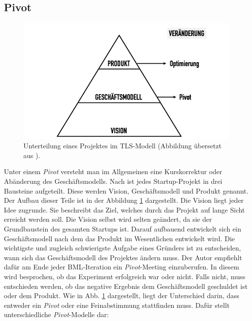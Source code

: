 \subsection*{\label{sec:LeanStartup-Pivot}\thesubsection\quad Pivot}
\begin{figure}
	\begin{center}
		\includegraphics[scale=0.5]{99_IMG/02_Grundlagen/visionStrategyProduct.jpg}
		\caption[Unterteilung eines Projektes im \ac{TLS}-Modell.]{Unterteilung eines Projektes im \ac{TLS}-Modell (Abbildung übersetzt aus ).}
		\label{fig:LeanStartup_VisionStrategyProduct}
	\end{center}
\end{figure}
Unter einem \textit{Pivot} versteht man im Allgemeinen eine Kurskorrektur oder Abänderung des Geschäftsmodells. Nach \citeauthor{TheLeanStartup} ist jedes Startup-Projekt in drei Bausteine aufgeteilt. Diese werden Vision, Geschäftsmodell und Produkt genannt. Der Aufbau dieser Teile ist in der Abbildung \ref{fig:LeanStartup_VisionStrategyProduct} dargestellt. 
Die Vision liegt jeder Idee zugrunde. Sie beschreibt das Ziel, welches durch das Projekt auf lange Sicht erreicht werden soll. Die Vision selbst wird selten geändert, da sie der Grundbaustein des gesamten Startups ist. Darauf aufbauend entwickelt sich ein Geschäftsmodell nach dem das Produkt im Wesentlichen entwickelt wird. Die wichtigste und zugleich schwierigste Aufgabe eines Gründers ist zu entscheiden, wann sich das Geschäftsmodell des Projektes ändern muss. Der Autor empfiehlt dafür am Ende jeder \ac{BML}-Iteration ein \textit{Pivot}-Meeting einzuberufen. In diesem wird besprochen, ob das Experiment erfolgreich war oder nicht. Falls nicht, muss entschieden werden, ob das negative Ergebnis dem Geschäftsmodell geschuldet ist oder dem Produkt. Wie in Abb. \ref{fig:LeanStartup_VisionStrategyProduct} dargestellt, liegt der Unterschied darin, dass entweder ein \textit{Pivot} oder eine Feinabstimmung stattfinden muss. Dafür stellt \citeauthor{TheLeanStartup} unterschiedliche \textit{Pivot}-Modelle dar:
